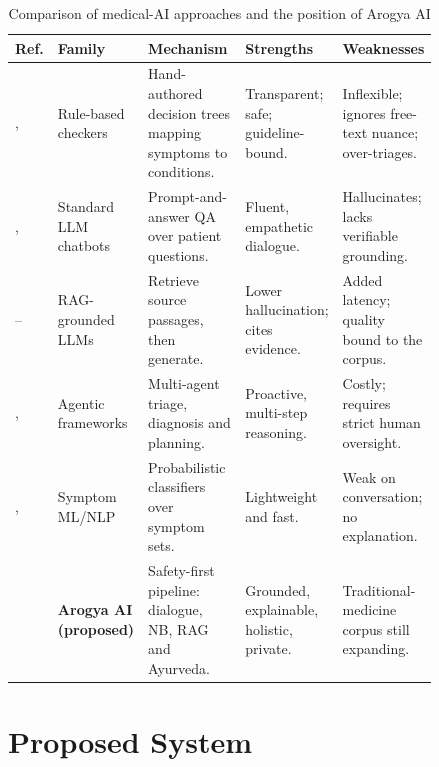 \documentclass[conference]{IEEEtran}
\begin{document}
\begin{table}[t]
\caption{Comparison of medical-AI approaches and the position of Arogya AI}
\label{tab:families}
\centering
\footnotesize
\begin{tabular}{@{}p{0.055\linewidth} p{0.125\linewidth} p{0.275\linewidth} p{0.165\linewidth} p{0.215\linewidth}@{}}
\toprule
\textbf{Ref.} & \textbf{Family} & \textbf{Mechanism} & \textbf{Strengths} & \textbf{Weaknesses}\\
\midrule
\cite{shortliffe}, \cite{semigran} & Rule-based checkers &
Hand-authored decision trees mapping symptoms to conditions. &
Transparent; safe; guideline-bound. &
Inflexible; ignores free-text nuance; over-triages.\\[2pt]
\cite{ayers}, \cite{singhal} & Standard LLM chatbots &
Prompt-and-answer QA over patient questions. &
Fluent, empathetic dialogue. &
Hallucinates; lacks verifiable grounding.\\[2pt]
\cite{lewis}--\cite{xiong} & RAG-grounded LLMs &
Retrieve source passages, then generate. &
Lower hallucination; cites evidence. &
Added latency; quality bound to the corpus.\\[2pt]
\cite{thamma}, \cite{patel} & Agentic frameworks &
Multi-agent triage, diagnosis and planning. &
Proactive, multi-step reasoning. &
Costly; requires strict human oversight.\\[2pt]
\cite{khan}, \cite{alqarni} & Symptom ML/NLP &
Probabilistic classifiers over symptom sets. &
Lightweight and fast. &
Weak on conversation; no explanation.\\[2pt]
\cite{spec} & \textbf{Arogya AI (proposed)} &
Safety-first pipeline: dialogue, NB, RAG and Ayurveda. &
Grounded, explainable, holistic, private. &
Traditional-medicine corpus still expanding.\\
\bottomrule
\end{tabular}
\end{table}

\section{Proposed System}
\end{document}
